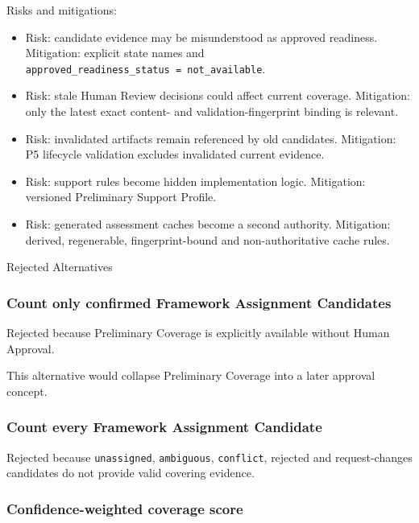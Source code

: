 Risks and mitigations:

\begin{itemize}
\item
  Risk: candidate evidence may be misunderstood as approved readiness. Mitigation: explicit state names and \texttt{approved\_readiness\_status\ =\ not\_available}.
\item
  Risk: stale Human Review decisions could affect current coverage. Mitigation: only the latest exact content- and validation-fingerprint binding is relevant.
\item
  Risk: invalidated artifacts remain referenced by old candidates. Mitigation: P5 lifecycle validation excludes invalidated current evidence.
\item
  Risk: support rules become hidden implementation logic. Mitigation: versioned Preliminary Support Profile.
\item
  Risk: generated assessment caches become a second authority. Mitigation: derived, regenerable, fingerprint-bound and non-authoritative cache rules.
\end{itemize}

Rejected Alternatives

\hypertarget{count-only-confirmed-framework-assignment-candidates}{%
\subsubsection{Count only confirmed Framework Assignment Candidates}\label{count-only-confirmed-framework-assignment-candidates}}

Rejected because Preliminary Coverage is explicitly available without Human Approval.

This alternative would collapse Preliminary Coverage into a later approval concept.

\hypertarget{count-every-framework-assignment-candidate}{%
\subsubsection{Count every Framework Assignment Candidate}\label{count-every-framework-assignment-candidate}}

Rejected because \texttt{unassigned}, \texttt{ambiguous}, \texttt{conflict}, rejected and request-changes candidates do not provide valid covering evidence.

\hypertarget{confidence-weighted-coverage-score}{%
\subsubsection{Confidence-weighted coverage score}\label{confidence-weighted-coverage-score}}

